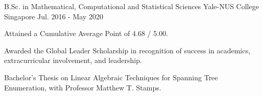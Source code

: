 

\begin{cventries}

  \cventry
    {B.Sc. in Mathematical, Computational and Statistical Sciences} %
    {Yale-NUS College} %
    {Singapore} %
    {Jul. 2016 - May 2020} %
    {
      \begin{cvitems} %
      \item {Attained a Cumulative Average Point of 4.68 / 5.00.}
      \item {Awarded the Global Leader Scholarship in recognition of success in
          academics, extracurricular involvement, and leadership.}
      \item {Bachelor's Thesis on Linear Algebraic Techniques for Spanning Tree
          Enumeration, with Professor Matthew T. Stamps.}
      \end{cvitems}
    }

\end{cventries}

